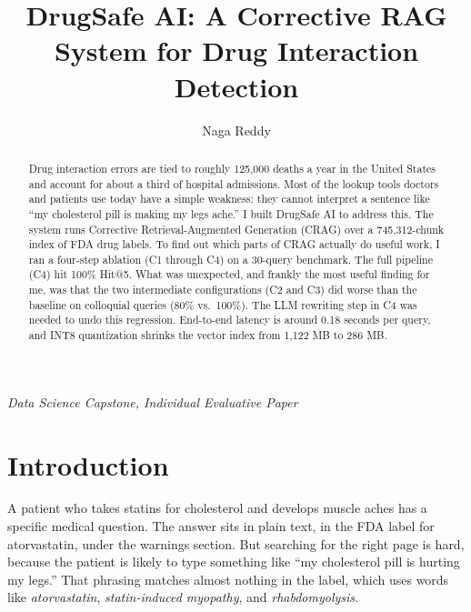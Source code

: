 \documentclass[12pt]{article}
\title{\bfseries DrugSafe AI: A Corrective RAG System for Drug Interaction Detection}
\date{}
\author{Naga Reddy}
\begin{document}
\maketitle
\vspace{-2.5em}

\begin{center}
\small\itshape
Data Science Capstone, Individual Evaluative Paper
\end{center}
\vspace{0.5em}

\begin{abstract}
\noindent
\singlespacing\small
Drug interaction errors are tied to roughly 125{,}000 deaths a year in the United States and account for about a third of hospital admissions. Most of the lookup tools doctors and patients use today have a simple weakness: they cannot interpret a sentence like ``my cholesterol pill is making my legs ache.'' I built DrugSafe AI to address this. The system runs Corrective Retrieval-Augmented Generation (CRAG) over a 745{,}312-chunk index of FDA drug labels. To find out which parts of CRAG actually do useful work, I ran a four-step ablation (C1 through C4) on a 30-query benchmark. The full pipeline (C4) hit 100\% Hit@5. What was unexpected, and frankly the most useful finding for me, was that the two intermediate configurations (C2 and C3) did worse than the baseline on colloquial queries (80\% vs.\ 100\%). The LLM rewriting step in C4 was needed to undo this regression. End-to-end latency is around 0.18 seconds per query, and INT8 quantization shrinks the vector index from 1{,}122 MB to 286 MB.
\end{abstract}

\vspace{0.5em}

\section{Introduction}

A patient who takes statins for cholesterol and develops muscle aches has a specific medical question. The answer sits in plain text, in the FDA label for atorvastatin, under the warnings section. But searching for the right page is hard, because the patient is likely to type something like ``my cholesterol pill is hurting my legs.'' That phrasing matches almost nothing in the label, which uses words like \textit{atorvastatin}, \textit{statin-induced myopathy}, and \textit{rhabdomyolysis}.
\end{document}

